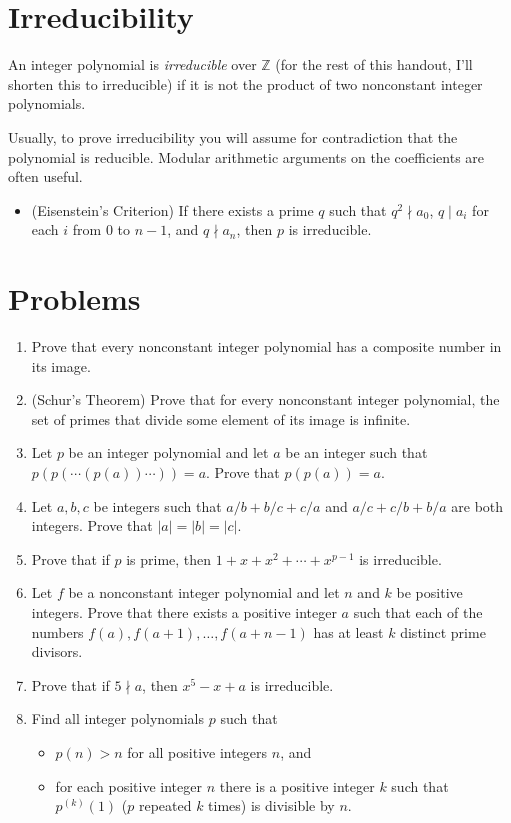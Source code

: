 \documentclass{article}
\begin{document}
\section{Irreducibility}
An integer polynomial is \emph{irreducible} over $\mathbb Z$ (for the rest of
this handout, I'll shorten this to irreducible) if it is not the product of two
nonconstant integer polynomials.

Usually, to prove irreducibility you will assume for contradiction that the
polynomial is reducible. Modular arithmetic arguments on the coefficients are
often useful.
\begin{itemize}
  \item (Eisenstein's Criterion) If there exists a prime $q$ such that $q^2\nmid
    a_0$, $q\mid a_i$ for each $i$ from $0$ to $n-1$, and $q\nmid a_n$, then $p$
    is irreducible.
\end{itemize}
\section{Problems}
\begin{enumerate}
  \item Prove that every nonconstant integer polynomial has a composite number
    in its image.
  \item (Schur's Theorem) Prove that for every nonconstant integer polynomial,
    the set of primes that divide some element of its image is infinite.
  \item Let $p$ be an integer polynomial and let $a$ be an integer such that
    $p(p(\cdots(p(a))\cdots))=a$. Prove that $p(p(a))=a$.
  \item Let $a,b,c$ be integers such that $a/b+b/c+c/a$ and $a/c+c/b+b/a$ are
    both integers. Prove that $|a|=|b|=|c|$.
  \item Prove that if $p$ is prime, then $1+x+x^2+\cdots+x^{p-1}$ is
    irreducible.
  \item Let $f$ be a nonconstant integer polynomial and let $n$ and $k$ be
    positive integers. Prove that there exists a positive integer $a$ such that
    each of the numbers $f(a),f(a+1),\ldots,f(a+n-1)$ has at least $k$ distinct
    prime divisors.
  \item Prove that if $5\nmid a$, then $x^5-x+a$ is irreducible.
  \item Find all integer polynomials $p$ such that
    \begin{itemize}
      \item $p(n)>n$ for all positive integers $n$, and
      \item for each positive integer $n$ there is a positive integer $k$ such
        that $p^{(k)}(1)$ ($p$ repeated $k$ times) is divisible by $n$.
    \end{itemize}
\end{enumerate}
\newpage
\end{document}
